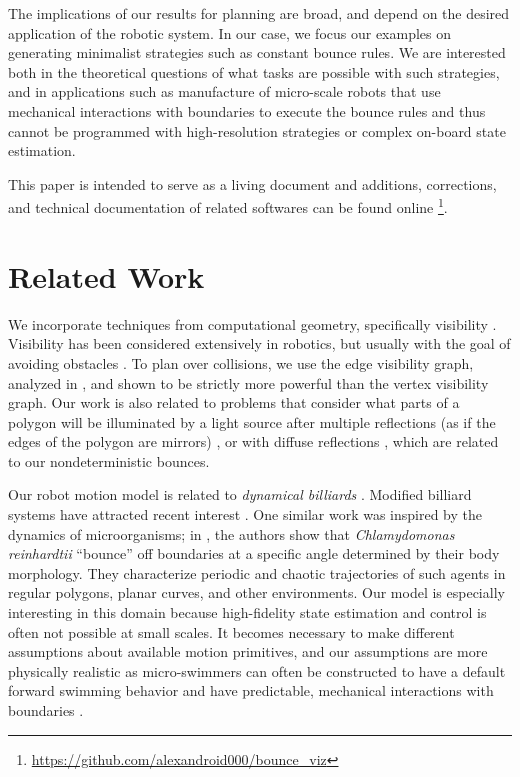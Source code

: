 \documentclass[sageh,times,Review]{sagej}
\begin{document}
The implications of our results for planning are broad, and depend on the
desired application of the robotic system. In our case, we focus our examples on
generating minimalist strategies such as constant bounce rules. We are
interested both in the theoretical questions of what tasks are possible with
such strategies, and in applications such as manufacture of micro-scale robots
that use mechanical interactions with boundaries to execute the bounce rules and
thus cannot be programmed with high-resolution strategies or complex on-board
state estimation.

This paper is intended to serve as a living document and additions, corrections, and
technical documentation of related softwares can be found online
\footnote{\url{https://github.com/alexandroid000/bounce_viz}}.

\section{Related Work}

We incorporate techniques from computational geometry, specifically visibility
\cite{ghosh2007visibility}. Visibility has been considered extensively in
robotics, but usually with the goal of avoiding obstacles
\cite{lozano1979algorithm,SimLauNis00}. To plan over collisions, we use the edge
visibility graph, analyzed in \cite{rourke_viz}, and shown to be strictly more
powerful than the vertex visibility graph. Our work is also related to problems
that consider what parts of a polygon will be illuminated by a light source
after multiple reflections (as if the edges of the polygon are mirrors)
\cite{Aronov1996}, or with diffuse reflections \cite{prasad1998visibility},
which are related to our nondeterministic bounces.

Our robot motion model is related to
\emph{dynamical billiards} \cite{billiards}. Modified billiard systems have attracted recent interest
\cite{DelMagno2014,pinball,billiards}. One similar work was inspired by the
dynamics of microorganisms; in \cite{microorganism2017}, the authors show that
\textit{Chlamydomonas reinhardtii} ``bounce'' off boundaries at a specific
angle determined by their body morphology. They characterize periodic and
chaotic trajectories of such agents in regular polygons, planar curves, and
other environments. Our model is especially interesting in this domain because
high-fidelity state estimation and control is often not possible at small
scales. It becomes necessary to make different assumptions about available
motion primitives, and our assumptions are more physically realistic as
micro-swimmers can often be constructed to have a default forward swimming
behavior and have predictable, mechanical interactions with boundaries
\cite{li2014hydrodynamic}.
\end{document}
